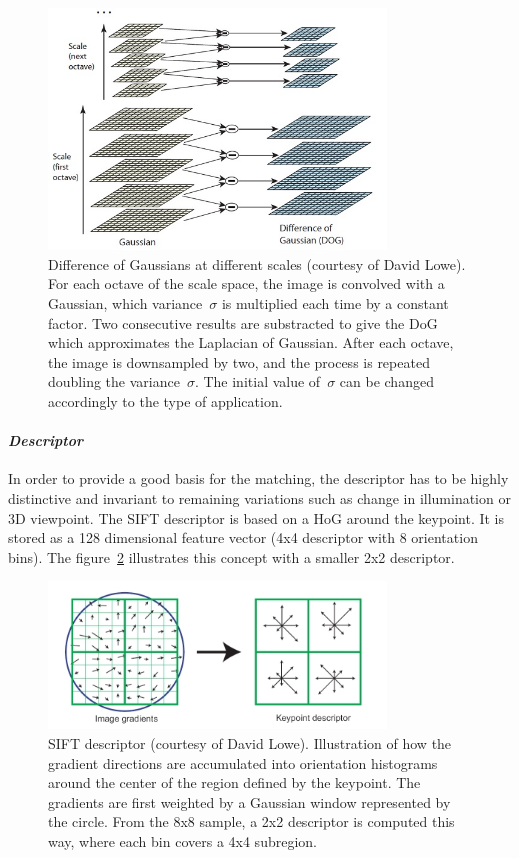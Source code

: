 \begin{figure}[h]
\centering
\includegraphics[width=0.8\textwidth]{figures/sift_dog}
\caption{Difference of Gaussians at different scales (courtesy of David Lowe). For each octave of the scale space, the image is convolved with a Gaussian, which variance~$\sigma$ is multiplied each time by a constant factor. Two consecutive results are substracted to give the DoG which approximates the Laplacian of Gaussian. After each octave, the image is downsampled by two, and the process is repeated doubling the variance~$\sigma$. The initial value of~$\sigma$ can be changed accordingly to the type of application. }
\label{fig:sift_dog}
\end{figure}

\paragraph{\emph{Descriptor}}

In order to provide a good basis for the matching, the descriptor has to be highly distinctive and invariant to remaining variations such as change in illumination or 3D viewpoint. The \gls{SIFT} descriptor is based on a \gls{HoG} around the keypoint. It is stored as a 128 dimensional feature vector (4x4 descriptor with 8 orientation bins). The figure~\ref{fig:sift_descriptor} illustrates this concept with a smaller 2x2 descriptor.

\begin{figure}[h]
\centering
\includegraphics[width=0.8\textwidth]{figures/sift_descriptor}
\caption{SIFT descriptor (courtesy of David Lowe). Illustration of how the gradient directions are accumulated into orientation histograms around the center of the region defined by the keypoint. The gradients are first weighted by a Gaussian window represented by the circle. From the 8x8 sample, a 2x2 descriptor is computed this way, where each bin covers a 4x4 subregion.}
\label{fig:sift_descriptor}
\end{figure}

